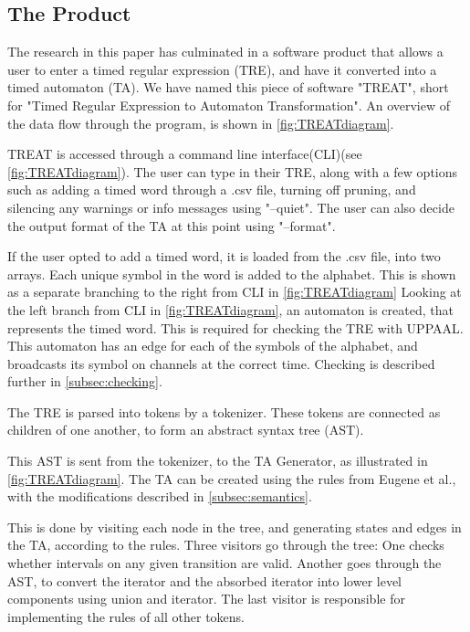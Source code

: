 \subsection{The Product}\label{subsec:theProduct}
The research in this paper has culminated in a software product that allows a user to enter a timed regular expression (TRE), and have it converted into a timed automaton (TA).
We have named this piece of software "TREAT", short for "Timed Regular Expression to Automaton Transformation".
An overview of the data flow through the program, is shown in \cref{fig:TREATdiagram}.



TREAT is accessed through a command line interface(CLI)(see \cref*{fig:TREATdiagram}). The user can type in their TRE, along with a few options such as adding a timed word through a .csv file, turning off pruning, and silencing any warnings or info messages using "--quiet".
The user can also decide the output format of the TA at this point using "--format".

If the user opted to add a timed word, it is loaded from the .csv file, into two arrays. Each unique symbol in the word is added to the alphabet. This is shown as a separate branching to the right from CLI in \cref*{fig:TREATdiagram}
Looking at the left branch from CLI in \cref*{fig:TREATdiagram}, an automaton is created, that represents the timed word. This is required for checking the TRE with UPPAAL. This automaton has an edge for each of the symbols of the alphabet, and broadcasts its symbol on channels at the correct time. Checking is described further in \cref{subsec:checking}.

The TRE is parsed into tokens by a tokenizer. These tokens are connected as children of one another, to form an abstract syntax tree (AST). 

This AST is sent from the tokenizer, to the TA Generator, as illustrated in \cref*{fig:TREATdiagram}. The TA can be created using the rules from Eugene et al., with the modifications described in \cref{subsec:semantics}.

This is done by visiting each node in the tree, and generating states and edges in the TA, according to the rules. Three visitors go through the tree: One checks whether intervals on any given transition are valid. Another goes through the AST, to convert the iterator and the absorbed iterator into lower level components using union and iterator. The last visitor is responsible for implementing the rules of all other tokens.


